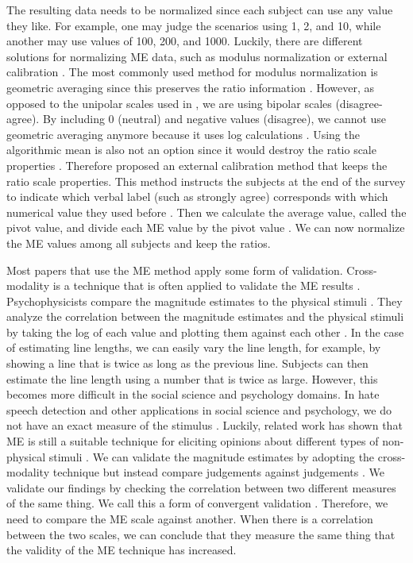\documentclass[a4paper]{article}
\begin{document}
The resulting data needs to be normalized since each subject can use any value they like. For example, one may judge the scenarios using 1, 2, and 10, while another may use values of 100, 200, and 1000. Luckily, there are different solutions for normalizing ME data, such as modulus normalization or external calibration \cite{moskowitz1977magnitude}. The most commonly used method for modulus normalization is geometric averaging since this preserves the ratio information \cite{moskowitz1977magnitude, mcgee2004master}. However, as opposed to the unipolar scales used in \cite{bard1996magnitude, mcgee2004master}, we are using bipolar scales (disagree-agree). By including 0 (neutral) and negative values (disagree), we cannot use geometric averaging anymore because it uses log calculations \cite{moskowitz1977magnitude}. Using the algorithmic mean is also not an option since it would destroy the ratio scale properties \cite{moskowitz1977magnitude}. Therefore \cite{moskowitz1977magnitude} proposed an external calibration method that keeps the ratio scale properties. This method instructs the subjects at the end of the survey to indicate which verbal label (such as strongly agree) corresponds with which numerical value they used before \cite{moskowitz1977magnitude}. Then we calculate the average value, called the pivot value, and divide each ME value by the pivot value \cite{moskowitz1977magnitude}. We can now normalize the ME values among all subjects and keep the ratios.

Most papers that use the ME method apply some form of validation. Cross-modality is a technique that is often applied to validate the ME results \cite{bard1996magnitude}. Psychophysicists compare the magnitude estimates to the physical stimuli \cite{bard1996magnitude}. They analyze the correlation between the magnitude estimates and the physical stimuli by taking the log of each value and plotting them against each other \cite{bard1996magnitude}. In the case of estimating line lengths, we can easily vary the line length, for example, by showing a line that is twice as long as the previous line. Subjects can then estimate the line length using a number that is twice as large. However, this becomes more difficult in the social science and psychology domains. In hate speech detection and other applications in social science and psychology, we do not have an exact measure of the stimulus \cite{bard1996magnitude}. Luckily, related work has shown that ME is still a suitable technique for eliciting opinions about different types of non-physical stimuli \cite{bard1996magnitude, mcgee2004master, maddalena2017crowdsourcing, lodge1979comparisons}. We can validate the magnitude estimates by adopting the cross-modality technique but instead compare judgements against judgements \cite{bard1996magnitude, lodge1979comparisons}. We validate our findings by checking the correlation between two different measures of the same thing. We call this a form of convergent validation \cite{fitzner2007reliability}. Therefore, we need to compare the ME scale against another. When there is a correlation between the two scales, we can conclude that they measure the same thing that the validity of the ME technique has increased.
\end{document}
